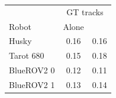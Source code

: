 \begin{tabular}{lcc}
\toprule
 & \multicolumn{2}{c}{GT tracks} \\
Robot & Alone & \avatar{} \\
\midrule
Husky & 0.16 & 0.16 \\
Tarot 680 & 0.15 & 0.18 \\
BlueROV2 0 & 0.12 & 0.11 \\
BlueROV2 1 & 0.13 & 0.14 \\
\bottomrule
\end{tabular}
